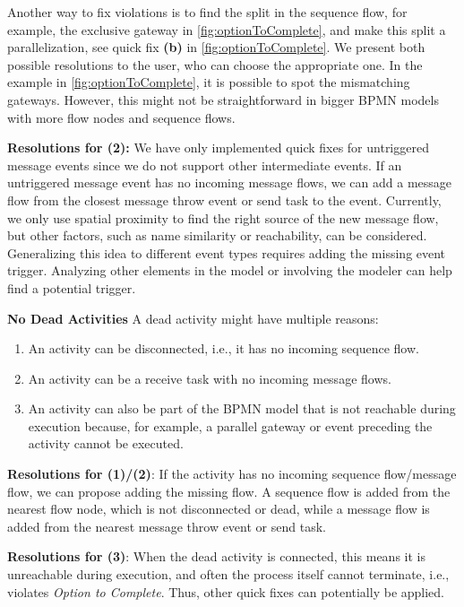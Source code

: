 \documentclass[runningheads]{llncs}
\newcommand{\subpart}[1]{\vspace{1em}\noindent\textbf{#1}}
\begin{document}
Another way to fix violations is to find the split in the sequence flow, for example, the exclusive gateway in \autoref{fig:optionToComplete}, and make this split a parallelization, see quick fix \textbf{(b)} in \autoref{fig:optionToComplete}.
We present both possible resolutions to the user, who can choose the appropriate one.
In the example in \autoref{fig:optionToComplete}, it is possible to spot the mismatching gateways.
However, this might not be straightforward in bigger BPMN models with more flow nodes and sequence flows.

\textbf{Resolutions for (2):} We have only implemented quick fixes for untriggered message events since we do not support other intermediate events.
If an untriggered message event has no incoming message flows, we can add a message flow from the closest message throw event or send task to the event.
Currently, we only use spatial proximity to find the right source of the new message flow, but other factors, such as name similarity or reachability, can be considered.
Generalizing this idea to different event types requires adding the missing event trigger.
Analyzing other elements in the model or involving the modeler can help find a potential trigger.

\subpart{No Dead Activities}
A dead activity might have multiple reasons:

\begin{enumerate}
	\item An activity can be disconnected, i.e., it has no incoming sequence flow.
	\item An activity can be a receive task with no incoming message flows.
	\item An activity can also be part of the BPMN model that is not reachable during execution because, for example, a parallel gateway or event preceding the activity cannot be executed.
\end{enumerate}

\textbf{Resolutions for (1)/(2)}: If the activity has no incoming sequence flow/message flow, we can propose adding the missing flow.
A sequence flow is added from the nearest flow node, which is not disconnected or dead, while a message flow is added from the nearest message throw event or send task.

\textbf{Resolutions for (3)}: When the dead activity is connected, this means it is unreachable during execution, and often the process itself cannot terminate, i.e., violates \textit{Option to Complete}.
Thus, other quick fixes can potentially be applied.
\end{document}
